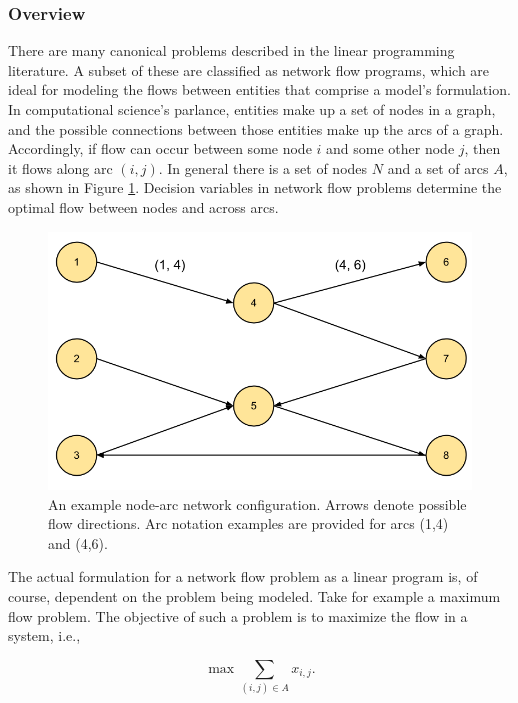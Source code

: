 \subsubsection{Overview}
There are many canonical problems described in the linear programming
literature. A subset of these are classified as network flow programs, which are
ideal for modeling the flows between entities that comprise a model's
formulation. In computational science's parlance, entities make up a set of
nodes in a graph, and the possible connections between those entities make up
the arcs of a graph. Accordingly, if flow can occur between some node $i$ and
some other node $j$, then it flows along arc $(i, j)$. In general there is a set
of nodes $N$ and a set of arcs $A$, as shown in Figure
\ref{fig:node-arcs}. Decision variables in network flow problems determine the
optimal flow between nodes and across arcs.

\begin{figure}[H]
  \begin{center}
    \includegraphics[width=\linewidth]{./chapters/litreview/node-arcs.png}
  \caption{An example node-arc network configuration. Arrows denote possible
    flow directions. Arc notation examples are provided for arcs (1,4) and
    (4,6).}
  \label{fig:node-arcs}
  \end{center}
\end{figure}

The actual formulation for a network flow problem as a linear program is, of
course, dependent on the problem being modeled. Take for example a maximum flow
problem. The objective of such a problem is to maximize the flow in a system,
i.e.,

\begin{equation}
\max \sum_{(i, j) \in A} x_{i,j}.
\end{equation}

